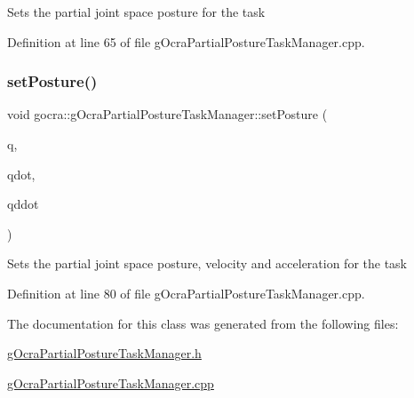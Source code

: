 Sets the partial joint space posture for the task 

Definition at line 65 of file g\+Ocra\+Partial\+Posture\+Task\+Manager.\+cpp.

\hypertarget{classgocra_1_1gOcraPartialPostureTaskManager_a98a6312d1705dbc7ae682bf7fb98a28c}{}\label{classgocra_1_1gOcraPartialPostureTaskManager_a98a6312d1705dbc7ae682bf7fb98a28c} 
\subsubsection{\texorpdfstring{set\+Posture()}{setPosture()}\hspace{0.1cm}{\footnotesize\ttfamily [2/2]}}
{\footnotesize\ttfamily void gocra\+::g\+Ocra\+Partial\+Posture\+Task\+Manager\+::set\+Posture (\begin{DoxyParamCaption}\item[{Eigen\+::\+Vector\+Xd \&}]{q,  }\item[{Eigen\+::\+Vector\+Xd \&}]{qdot,  }\item[{Eigen\+::\+Vector\+Xd \&}]{qddot }\end{DoxyParamCaption})}

Sets the partial joint space posture, velocity and acceleration for the task 

Definition at line 80 of file g\+Ocra\+Partial\+Posture\+Task\+Manager.\+cpp.



The documentation for this class was generated from the following files\+:\begin{DoxyCompactItemize}
\item 
\hyperlink{gOcraPartialPostureTaskManager_8h}{g\+Ocra\+Partial\+Posture\+Task\+Manager.\+h}\item 
\hyperlink{gOcraPartialPostureTaskManager_8cpp}{g\+Ocra\+Partial\+Posture\+Task\+Manager.\+cpp}\end{DoxyCompactItemize}
